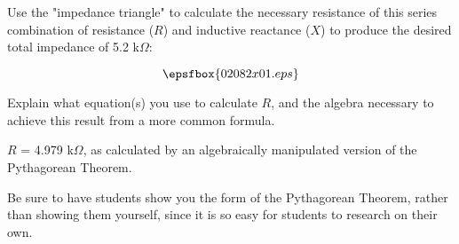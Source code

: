 

Use the "impedance triangle" to calculate the necessary resistance of this series combination of resistance ($R$) and inductive reactance ($X$) to produce the desired total impedance of 5.2 k$\Omega$:

$$\epsfbox{02082x01.eps}$$

Explain what equation(s) you use to calculate $R$, and the algebra necessary to achieve this result from a more common formula.







$R$ = 4.979 k$\Omega$, as calculated by an algebraically manipulated version of the Pythagorean Theorem.







Be sure to have students show you the form of the Pythagorean Theorem, rather than showing them yourself, since it is so easy for students to research on their own.




